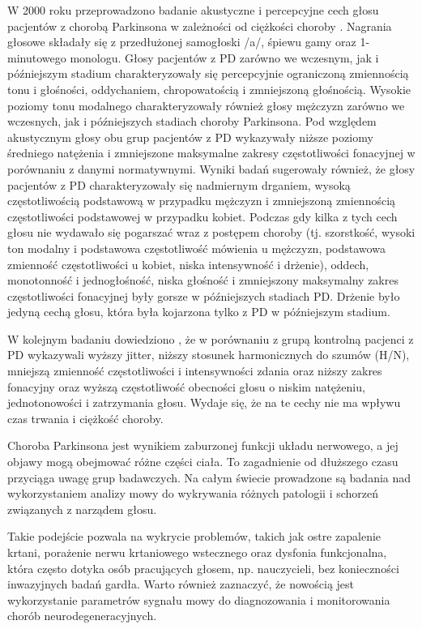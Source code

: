 W 2000 roku przeprowadzono badanie akustyczne i percepcyjne cech głosu pacjentów z chorobą Parkinsona w zależności od
ciężkości choroby \cite{https://doi.org/10.1080/136828200410654}.
Nagrania głosowe składały się z przedłużonej samogłoski /a/, śpiewu gamy oraz 1-minutowego monologu.
Głosy pacjentów z PD zarówno we wczesnym, jak i późniejszym stadium charakteryzowały się percepcyjnie ograniczoną
zmiennością tonu i głośności, oddychaniem, chropowatością i zmniejszoną głośnością.
Wysokie poziomy tonu modalnego charakteryzowały również głosy mężczyzn zarówno we wczesnych, jak i późniejszych stadiach choroby Parkinsona.
Pod względem akustycznym głosy obu grup pacjentów z PD wykazywały niższe poziomy średniego natężenia i zmniejszone
maksymalne zakresy częstotliwości fonacyjnej w porównaniu z danymi normatywnymi.
Wyniki badań sugerowały również, że głosy pacjentów z PD charakteryzowały się nadmiernym drganiem, wysoką częstotliwością
podstawową w przypadku mężczyzn i zmniejszoną zmiennością częstotliwości podstawowej w przypadku kobiet.
Podczas gdy kilka z tych cech głosu nie wydawało się pogarszać wraz z postępem choroby (tj. szorstkość, wysoki ton modalny
i podstawowa częstotliwość mówienia u mężczyzn, podstawowa zmienność częstotliwości u kobiet, niska intensywność i drżenie),
oddech, monotonność i jednogłośność, niska głośność i zmniejszony maksymalny zakres częstotliwości fonacyjnej były gorsze w
późniejszych stadiach PD. Drżenie było jedyną cechą głosu, która była kojarzona tylko z PD w późniejszym stadium.

W kolejnym badaniu dowiedziono \cite{GAMBOA1997314}, że w porównaniu z grupą kontrolną pacjenci z PD wykazywali wyższy jitter,
niższy stosunek harmonicznych do szumów (H/N), mniejszą zmienność częstotliwości i intensywności zdania oraz niższy zakres
fonacyjny oraz wyższą częstotliwość obecności głosu o niskim natężeniu, jednotonowości i zatrzymania głosu.
Wydaje się, że na te cechy nie ma wpływu czas trwania i ciężkość choroby.

Choroba Parkinsona jest wynikiem zaburzonej funkcji układu nerwowego, a jej objawy mogą obejmować różne części ciała.
To zagadnienie od dłuższego czasu przyciąga uwagę grup badawczych.
Na całym świecie prowadzone są badania nad wykorzystaniem analizy mowy do wykrywania różnych patologii i schorzeń związanych z narządem głosu.

Takie podejście pozwala na wykrycie problemów, takich jak ostre zapalenie krtani, porażenie nerwu krtaniowego wstecznego oraz dysfonia funkcjonalna,
która często dotyka osób pracujących głosem, np. nauczycieli, bez konieczności inwazyjnych badań gardła. Warto również zaznaczyć, że nowością
jest wykorzystanie parametrów sygnału mowy do diagnozowania i monitorowania chorób neurodegeneracyjnych.

